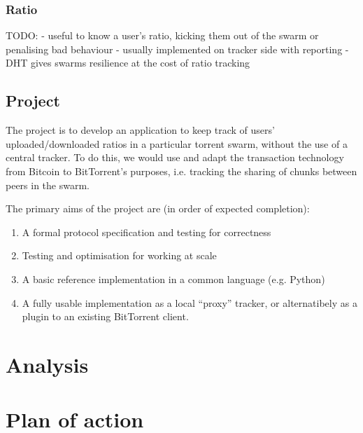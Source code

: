 \documentclass{article}
\begin{document}
\subsubsection{Ratio}
TODO:
- useful to know a user's ratio, kicking them out of the swarm or penalising bad behaviour
- usually implemented on tracker side with reporting
- DHT gives swarms resilience at the cost of ratio tracking

\subsection{Project}

The project is to develop an application to keep track of users' uploaded/downloaded ratios in a particular torrent swarm, without the use of a central tracker.  To do this, we would use and adapt the transaction technology from Bitcoin to BitTorrent's purposes, i.e. tracking the sharing of chunks between peers in the swarm.

The primary aims of the project are (in order of expected completion):
\begin{enumerate}
\item A formal protocol specification and testing for correctness
\item Testing and optimisation for working at scale
\item A basic reference implementation in a common language (e.g. Python)
\item A fully usable implementation as a local ``proxy'' tracker, or alternatibely as a plugin to an existing BitTorrent client.
\end{enumerate}


\section{Analysis}

\section{Plan of action}
\end{document}
